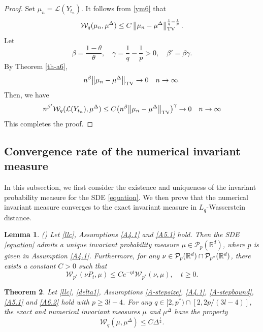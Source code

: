 \documentclass[preprint,12pt,compress]{elsarticle}
\newtheorem{theorem}{Theorem}[section] %
\newtheorem{lemma}[theorem]{Lemma}%
\begin{document}
\begin{proof}
Set $\mu_n  = \mathcal{L}(Y_{t_n})$.
It follows from \eqref{ym6} that
\begin{equation*}  
	{\mathcal{W}_q}({\mu _n},{\mu ^\Delta }) \le C\left\| {{\mu _n} - {\mu ^\Delta }} \right\|_{{\rm TV}}^{\frac{1}{q} - \frac{1}{p}}.
\end{equation*}
Let
\begin{equation*}
	\beta = \frac{1-\theta}{\theta}, \quad \gamma = \frac{1}{q} - \frac{1}{p}>0, \quad \beta' = \beta \gamma.
\end{equation*}
By Theorem \ref{th-a6},
\begin{equation*}
	{n^\beta }{\left\| {{\mu _n} - {\mu ^\Delta }} \right\|_{\rm TV}} \to 0 \quad n \to \infty .
\end{equation*}
Then, we have
\begin{equation*}
	{n^{\beta' }}{\mathcal{W}_q}(\mathcal{L}({Y_{{t_n}}}),{\mu ^\Delta }) \le C{\left( {{n^\beta }{{\left\| {{\mu _n} - {\mu ^\Delta }} \right\|}_{\rm TV}}} \right)^\gamma } \to 0 \quad n \to \infty
\end{equation*}
This completes the proof.
\end{proof}


\subsection{Convergence rate of the numerical invariant measure}
In this subsection, we first consider the existence and uniqueness of the invariant probability measure for the SDE \eqref{equation}. We then prove that the numerical invariant measure converges to the exact invariant measure in $L_q$-Wasserstein distance.

\begin{lemma} (\cite[Theorem 3.1]{wang2018distribution}) \label{lem-a1}
	Let \eqref{llc}, Assumptions \ref{A4.1} and \ref{A5.1} hold. Then the SDE \eqref{equation} admits a unique invariant probability measure $\mu \in \mathcal{P}_p (\mathbb{R}^d)$, where $p$ is given in Assumption \ref{A4.1}. Furthermore, for any $\nu  \in {{\cal P}_p}({\mathbb{R}^d}) \cap {{\cal P}_{{p^*}}}(\mathbb{R}^d)$, there exists a constant $C > 0$ such that
	\begin{equation*}
		{\mathcal{W}_{p^*}}(\nu{P_t} ,\mu ) \le C{e^{ - \eta t}}{\mathcal{W}_{p^*}}(\nu ,\mu ), \quad t \ge 0.
	\end{equation*}
\end{lemma}

\begin{theorem}  \label{th-a5}
Let \eqref{llc}, \eqref{delta1}, Assumptions \ref{A-stepsize}, \ref{A4.1}, \ref{A-stepbound}, \ref{A5.1} and \ref{A6.2} hold with $p \ge 3l-4$. For any $q \in [2,p^ * ) \cap \left[ {2,{{2p}}/(3l - 4)} \right]$, the exact and numerical invariant measures $\mu$ and $\mu^{\Delta}$ have the property
\begin{equation*}
	{\mathcal{W}_q}(\mu ,{\mu^\Delta }) \le C{\Delta ^{\frac{1}{2}}} .
\end{equation*}
\end{theorem}
\end{document}
